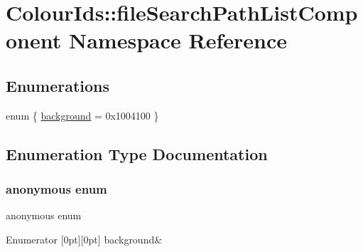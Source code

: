 \hypertarget{namespaceColourIds_1_1fileSearchPathListComponent}{}\section{Colour\+Ids\+:\+:file\+Search\+Path\+List\+Component Namespace Reference}
\label{namespaceColourIds_1_1fileSearchPathListComponent}
\subsection*{Enumerations}
\begin{DoxyCompactItemize}
\item 
enum \{ \mbox{\hyperlink{namespaceColourIds_1_1fileSearchPathListComponent_abfa0c13a179740ba87d3323e4381270eacdd524031ed2be63d64bd4586f5c234a}{background}} = 0x1004100
 \}
\end{DoxyCompactItemize}


\subsection{Enumeration Type Documentation}
\mbox{\label{namespaceColourIds_1_1fileSearchPathListComponent_abfa0c13a179740ba87d3323e4381270e}} 
\subsubsection{\texorpdfstring{anonymous enum}{anonymous enum}}
{\footnotesize\ttfamily anonymous enum}

\begin{DoxyEnumFields}{Enumerator}
[0pt][0pt]{}\mbox{\label{namespaceColourIds_1_1fileSearchPathListComponent_abfa0c13a179740ba87d3323e4381270eacdd524031ed2be63d64bd4586f5c234a}} 
background&\\
\hline

\end{DoxyEnumFields}
